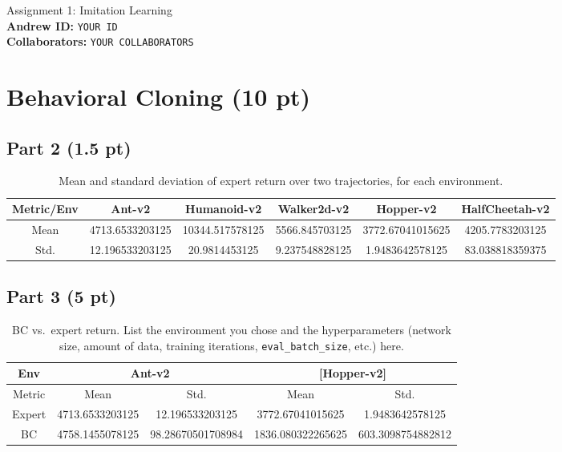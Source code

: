 \documentclass{article}
\begin{document}
\begin{center}
    {\Large Assignment 1: Imitation Learning} \\
    \vspace{.25cm}
    \textbf{Andrew ID:} \texttt{YOUR ID} \\
    \textbf{Collaborators:} \texttt{YOUR COLLABORATORS}
\end{center}


\section{Behavioral Cloning (10 pt)}

\subsection{Part 2 (1.5 pt)}
\begin{table}[!h]
  \centering
  \caption{Mean and standard deviation of expert return over two trajectories, for each environment.}
  \begin{tabular}{cccccc}
    \toprule
    Metric/Env & Ant-v2 & Humanoid-v2 & Walker2d-v2 & Hopper-v2 & HalfCheetah-v2 \\
    \midrule
    Mean  & 4713.6533203125 & 10344.517578125 & 5566.845703125 & 3772.67041015625 & 4205.7783203125 \\
    Std.  & 12.196533203125 & 20.9814453125 & 9.237548828125 & 1.9483642578125 & 83.038818359375 \\
    \bottomrule
  \end{tabular}
  \label{tab:p2}
\end{table}

\subsection{Part 3 (5 pt)}
\begin{table}[htbp]
  \centering
  \caption{BC vs.\ expert return. List the environment you chose and the hyperparameters (network size, amount of data, training iterations, \texttt{eval\_batch\_size}, etc.) here.}
  \begin{tabular}{ccccc}
    \toprule
    Env   & \multicolumn{2}{c}{Ant-v2} & \multicolumn{2}{c}{[Hopper-v2]} \\
    \midrule
    Metric & Mean  & Std.  & Mean  & Std. \\
    Expert & 4713.6533203125 & 12.196533203125 & 3772.67041015625 & 1.9483642578125 \\
    BC     & 4758.1455078125 & 98.28670501708984 & 1836.080322265625 & 603.3098754882812 \\
    \bottomrule
  \end{tabular}
  \label{tab:p3}
\end{table}
\end{document}
